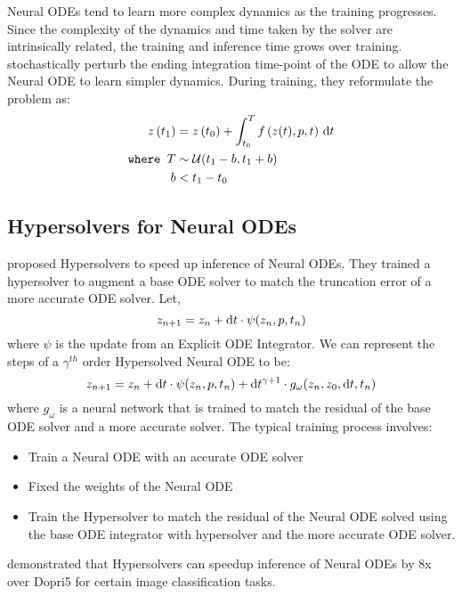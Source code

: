 Neural ODEs tend to learn more complex dynamics as the training progresses. Since the complexity of the dynamics and time taken by the solver are intrinsically related, the training and inference time grows over training. \citet{ghosh2020steer} stochastically perturb the ending integration time-point of the ODE to allow the Neural ODE to learn simpler dynamics. During training, they reformulate the problem as:
%
\begin{align}
  z\left(t_1\right)      & = z\left(t_0\right) + \int_{t_0}^{T} f\left(z(t), p, t\right) \, \mathrm{d}t \\
  \texttt{where } T  & \sim \mathcal{U}(t_1 - b, t_1 + b)                           \\
  \phantom{where } b & < t_1 - t_0
\end{align}
%

\subsection{Hypersolvers for Neural ODEs}
\label{subsec:hypersolvers_for_neural_odes}

\citet{poli2020hypersolvers} proposed Hypersolvers to speed up inference of Neural ODEs. They trained a hypersolver to augment a base ODE solver to match the truncation error of a more accurate ODE solver. Let,
%
\begin{equation}
  z_{n + 1} = z_n + \mathrm{d}t \cdot \psi(z_n, p, t_n)
\end{equation}
%
where $\psi$ is the update from an Explicit ODE Integrator. We can represent the steps of a $\gamma^{th}$ order Hypersolved Neural ODE to be:
%
\begin{equation}
  z_{n + 1} = z_n + \mathrm{d}t \cdot \psi(z_n, p, t_n) + \mathrm{d}t^{\gamma + 1} \cdot g_\omega(z_n, z_0, \mathrm{d}t, t_n)
\end{equation}
%
where $g_\omega$ is a neural network that is trained to match the residual of the base ODE solver and a more accurate solver. The typical training process involves:
%
\begin{itemize}
  \item Train a Neural ODE with an accurate ODE solver
  \item Fixed the weights of the Neural ODE
  \item Train the Hypersolver to match the residual of the Neural ODE solved using the base ODE integrator with hypersolver and the more accurate ODE solver.
\end{itemize}
%
\citet{poli2020hypersolvers} demonstrated that Hypersolvers can speedup inference of Neural ODEs by 8x over Dopri5 for certain image classification tasks.

